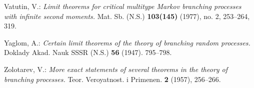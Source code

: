 \documentclass[12pt,a4paper]{amsart}
\theoremstyle{definition}
\numberwithin{equation}{section}
\begin{document}
\begin{thebibliography}{10}
	Vatutin, V.:
	\emph{Limit theorems for critical multitype Markov branching processes with infinite second moments.}
	Mat. Sb. (N.S.) \textbf{103(145)} (1977), no. 2, 253–264, 319.

	Yaglom, A.:
	\emph{Certain limit theorems of the theory of branching random processes.}
	Doklady Akad. Nauk SSSR (N.S.) \textbf{56} (1947). 795–798.
	
	Zolotarev, V.:
	\emph{More exact statements of several theorems in the theory of branching processes.}
	Teor. Veroyatnost. i Primenen. \textbf{2} (1957), 256–266.
	
\end{thebibliography}
\end{document}
